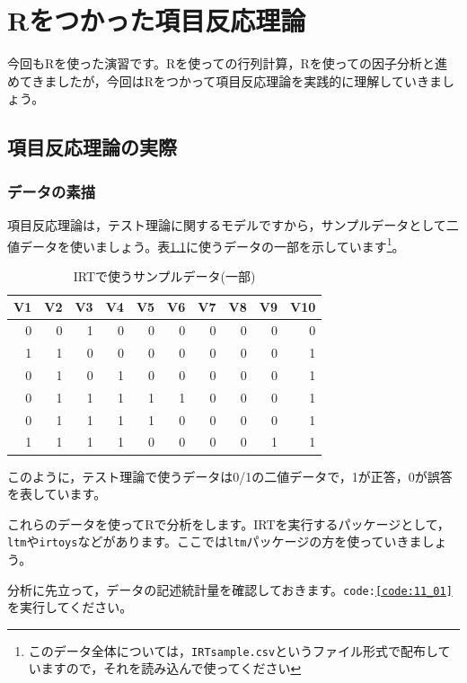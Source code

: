 \documentclass{ltjsbook}
\begin{document}
\chapter{Rをつかった項目反応理論}
\label{x11_IRTonR}

今回もRを使った演習です。Rを使っての行列計算，Rを使っての因子分析と進めてきましたが，今回はRをつかって項目反応理論を実践的に理解していきましょう。

\section{項目反応理論の実際}
\subsection{データの素描}
項目反応理論は，テスト理論に関するモデルですから，サンプルデータとして二値データを使いましょう。表\ref{tbl:11_01}に使うデータの一部を示しています\footnote{このデータ全体については，\texttt{IRTsample.csv}というファイル形式で配布していますので，それを読み込んで使ってください}。
\begin{table}[ht]
	\caption{IRTで使うサンプルデータ(一部)}
	\centering
	\begin{tabular}[t]{rrrrrrrrrr}
		\hline
		V1 & V2 & V3 & V4 & V5 & V6 & V7 & V8 & V9 & V10 \\
		\hline
		0  & 0  & 1  & 0  & 0  & 0  & 0  & 0  & 0  & 0   \\
		1  & 1  & 0  & 0  & 0  & 0  & 0  & 0  & 0  & 1   \\
		0  & 1  & 0  & 1  & 0  & 0  & 0  & 0  & 0  & 1   \\
		0  & 1  & 1  & 1  & 1  & 1  & 0  & 0  & 0  & 1   \\
		0  & 1  & 1  & 1  & 1  & 0  & 0  & 0  & 0  & 1   \\
		1  & 1  & 1  & 1  & 0  & 0  & 0  & 0  & 1  & 1   \\
		\hline
	\end{tabular}
	\label{tbl:11_01}
\end{table}

このように，テスト理論で使うデータは0/1の二値データで，1が正答，0が誤答を表しています。

これらのデータを使ってRで分析をします。IRTを実行するパッケージとして，\texttt{ltm}\textcite{ltm}や\texttt{irtoys}\textcite{partchev2017package}などがあります。ここでは\texttt{ltm}パッケージの方を使っていきましょう。

分析に先立って，データの記述統計量を確認しておきます。\texttt{code:\ref{code:11_01}}を実行してください。
\end{document}

